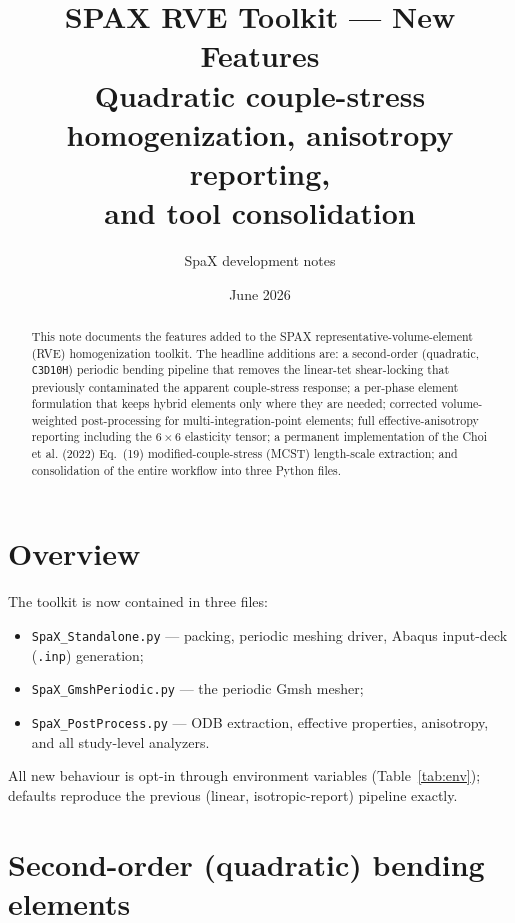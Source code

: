 \documentclass[11pt]{article}
\title{\textbf{SPAX RVE Toolkit --- New Features}\\[2pt]
\large Quadratic couple-stress homogenization, anisotropy reporting,\\
and tool consolidation}
\author{SpaX development notes}
\date{June 2026}
\newcommand{\code}[1]{\texttt{\small #1}}
\begin{document}
\maketitle

\begin{abstract}
This note documents the features added to the SPAX representative-volume-element
(RVE) homogenization toolkit. The headline additions are: a second-order
(quadratic, \code{C3D10H}) periodic bending pipeline that removes the linear-tet
shear-locking that previously contaminated the apparent couple-stress response;
a per-phase element formulation that keeps hybrid elements only where they are
needed; corrected volume-weighted post-processing for multi-integration-point
elements; full effective-anisotropy reporting including the $6{\times}6$
elasticity tensor; a permanent implementation of the Choi et al. (2022) Eq.~(19)
modified-couple-stress (MCST) length-scale extraction; and consolidation of the
entire workflow into three Python files.
\end{abstract}

\tableofcontents

\section{Overview}
The toolkit is now contained in three files:
\begin{itemize}[nosep]
  \item \code{SpaX\_Standalone.py} --- packing, periodic meshing driver,
        Abaqus input-deck (\code{.inp}) generation;
  \item \code{SpaX\_GmshPeriodic.py} --- the periodic Gmsh mesher;
  \item \code{SpaX\_PostProcess.py} --- ODB extraction, effective properties,
        anisotropy, and all study-level analyzers.
\end{itemize}
All new behaviour is opt-in through environment variables (Table~\ref{tab:env});
defaults reproduce the previous (linear, isotropic-report) pipeline exactly.

\section{Second-order (quadratic) bending elements}
\label{sec:quad}
\end{document}
